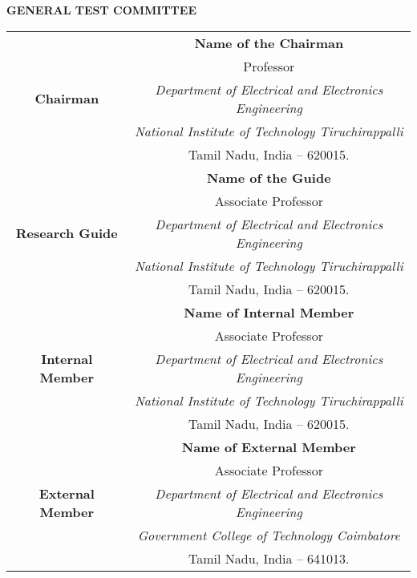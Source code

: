 {}
\centerline{\normalsize\textbf {GENERAL TEST COMMITTEE}}
\vspace{0cm}
\smallskip
\begin{table}[hbtp]
\centering
\renewcommand{\arraystretch}{1.25}
\begin{tabular}{|p{} p{}} \hline
 & \multicolumn{1}{|c|}{\textbf{Name of the Chairman}} \\
 & \multicolumn{1}{|c|}{Professor}  \\
\multicolumn{1}{|c}{\textbf{Chairman}}  & \multicolumn{1}{|c|}{\textit{Department of Electrical and Electronics Engineering}}   \\
 & \multicolumn{1}{|c|}{\textit{National Institute of Technology Tiruchirappalli}} \\
 & \multicolumn{1}{|c|}{Tamil Nadu, India -- 620015.}\\ \hline \hline
  & \multicolumn{1}{|c|}{\textbf{Name of the Guide}}\\
 & \multicolumn{1}{|c|}{Associate Professor} \\
\multicolumn{1}{|c}{\textbf{Research Guide}} & \multicolumn{1}{|c|}{\textit{Department of Electrical and Electronics Engineering}}\\
 & \multicolumn{1}{|c|}{\textit{\textit{National Institute of Technology Tiruchirappalli}}} \\
 & \multicolumn{1}{|c|}{Tamil Nadu, India -- 620015.} \\ \hline \hline
 & \multicolumn{1}{|c|}{\textbf{Name of Internal Member}}\\
 & \multicolumn{1}{|c|}{Associate Professor} \\
\multicolumn{1}{|c}{\textbf{Internal Member}} & \multicolumn{1}{|c|}{\textit{Department of Electrical and Electronics Engineering}}\\
 & \multicolumn{1}{|c|}{\textit{National Institute of Technology Tiruchirappalli}} \\
 & \multicolumn{1}{|c|}{Tamil Nadu, India -- 620015.} \\ \hline \hline
 & \multicolumn{1}{|c|}{\textbf{Name of External Member}}  \\
 & \multicolumn{1}{|c|}{Associate Professor} \\
\multicolumn{1}{|c}{\textbf{External Member}}  & \multicolumn{1}{|c|}{\textit{Department of Electrical and Electronics Engineering}} \\
 & \multicolumn{1}{|c|}{\textit{Government College of Technology Coimbatore}} \\
 & \multicolumn{1}{|c|}{Tamil Nadu, India -- 641013.} \\ \hline
\end{tabular}
\end{table}